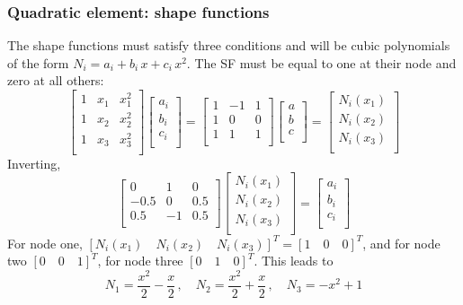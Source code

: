 \documentclass[notes]{beamer}
\begin{document}
\begin{frame}
\frametitle{Quadratic element: shape functions}
	The shape functions must satisfy three conditions and will be cubic polynomials of the form $N_i = a_i + b_i\, x + c_i\, x^2$. The SF must be equal to one at their node and zero at all others:
	\begin{equation*}
		\begin{bmatrix}
			1 & x_1 & x_1^2 \\
			1 & x_2 & x_2^2 \\
			1 & x_3 & x_3^2 \\
		\end{bmatrix}
		\begin{bmatrix}
			a_i \\
			b_i \\
			c_i \\
		\end{bmatrix}
		= %
		\begin{bmatrix}
			1 & -1 & 1 \\
			1 &  0 & 0\\
			1 &  1 & 1 \\
		\end{bmatrix}
		\begin{bmatrix}
			a \\
			b \\
			c \\
		\end{bmatrix}
		= 
		\begin{bmatrix}
			N_i(x_1) \\
			N_i(x_2) \\
			N_i(x_3) \\
		\end{bmatrix}
	\end{equation*}
Inverting,	
	\begin{equation*}
	\begin{bmatrix}
		 0   &  1 & 0   \\
        -0.5 &  0 & 0.5 \\
		 0.5 & -1 & 0.5 \\
	\end{bmatrix}
	\begin{bmatrix}
		N_i(x_1) \\
		N_i(x_2) \\
		N_i(x_3) \\
	\end{bmatrix} =
	\begin{bmatrix}
		a_i \\
		b_i \\
		c_i \\
	\end{bmatrix}
	\end{equation*}
For node one, $\left[N_i(x_1) \quad N_i(x_2) \quad N_i(x_3)\right]^T = \left[1 \quad 0 \quad 0 \right]^T$, and for node two $\left[0 \quad 0 \quad 1 \right]^T$, for node three $\left[0 \quad 1 \quad 0 \right]^T$. This leads to
	\begin{equation*}
		N_1 = \frac{x^2}{2} - \frac{x}{2} \,, \quad %
		N_2 = \frac{x^2}{2} + \frac{x}{2} \,, \quad %
		N_3 = -x^2 + 1
	\end{equation*}

\end{frame}
\end{document}
